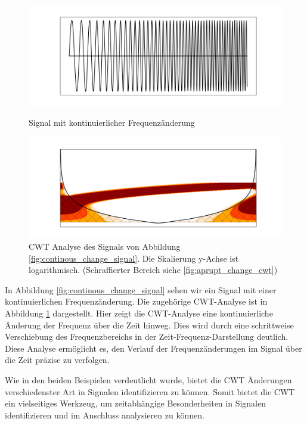 \begin{figure}[H]   
     \centering
    \includegraphics[width=0.9\linewidth]{images/continous_change_signal.png}
    \caption{Signal mit kontinuierlicher Frequenzänderung}
    \label{fig:continous_change_signal}   
    \includegraphics[width=0.9\linewidth]{images/continous_change_cwt.png}
    \caption[CWT Analyse eines Signals mit kontinuierlicher Frequenzänderung]{CWT Analyse des Signals von Abbildung \ref{fig:continous_change_signal}. Die Skalierung y-Achse ist logarithmisch. (Schraffierter Bereich siehe \ref{fig:aprupt_change_cwt})}
    \label{fig:continous_change_cwt}
\end{figure}

In Abbildung \ref{fig:continous_change_signal} sehen wir ein Signal mit einer kontinuierlichen Frequenzänderung. Die zugehörige \ac{CWT}-Analyse ist in Abbildung \ref{fig:continous_change_cwt} dargestellt. Hier zeigt die \ac{CWT}-Analyse eine kontinuierliche Änderung der Frequenz über die Zeit hinweg. Dies wird durch eine schrittweise Verschiebung des Frequenzbereichs in der Zeit-Frequenz-Darstellung deutlich. Diese Analyse ermöglicht es, den Verlauf der Frequenzänderungen im Signal über die Zeit präzise zu verfolgen.

Wie in den beiden Beispielen verdeutlicht wurde, bietet die \ac{CWT} Änderungen verschiedenster Art in Signalen identifizieren zu können. Somit bietet die \ac{CWT} ein vielseitiges Werkzeug, um zeitabhängige Besonderheiten in Signalen identifizieren und im Anschluss analysieren zu können.

